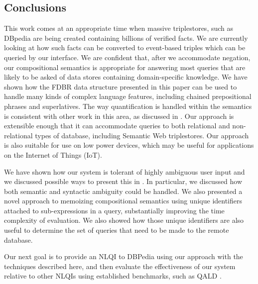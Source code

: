 \documentclass[../main.tex]{subfiles}
\begin{document}
\begin{refsection}
\section{Conclusions}
\label{webist2019journal:conclusions}

This work comes at an appropriate time when massive triplestores, such as DBpedia \cite{dbpedia} are being created containing billions of verified facts. We are currently looking at how such facts can be converted to event-based triples which can be queried by our interface.
We are confident that, after we accommodate negation, our compositional semantics is appropriate for answering most queries that are likely to be asked of data stores containing domain-specific knowledge. We have shown how the FDBR data structure presented in this paper can be used to handle many kinds of complex language features, including chained prepositional phrases and superlatives. The way quantification is handled within the semantics is consistent with other work in this area, as discussed in . Our approach is extensible enough that it can accommodate queries to both relational and non-relational types of database, including Semantic Web triplestores. Our approach is also suitable for use on low power devices, which may be useful for applications on the Internet of Things (IoT).

We have shown how our system is tolerant of highly ambiguous user input and we discussed possible ways to present this in .  In particular, we discussed how both semantic and syntactic ambiguity could be handled.
We also presented a novel approach to memoizing compositional semantics using unique identifiers attached to sub-expressions in a query, substantially improving the time complexity of evaluation. We also showed how those unique identifiers are also useful to determine the set of queries that need to be made to the remote database.

Our next goal is to provide an NLQI to DBPedia using our approach with the techniques described here, and then evaluate the effectiveness of our system relative to other NLQIs using established benchmarks, such as QALD \cite{qald9}.




\end{refsection}
\end{document}
